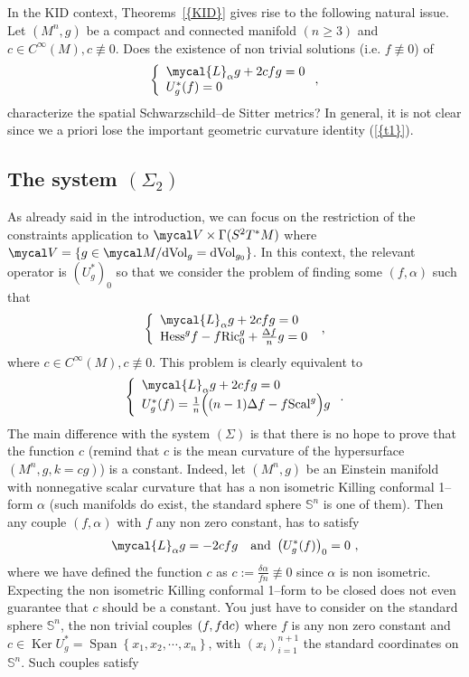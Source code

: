 \documentclass[a4paper,11pt,leqno]{amsart}
\numberwithin{equation}{section}
\theoremstyle{main}
\begin{document}
In the KID context, Theorems~{\ref{{KID}}}  gives rise to the following natural issue.\\
{} Let $(M^n,g)$ be a compact and connected manifold $(n\ge3)$ and ${c\in C^\infty (M), c\not\equiv 0}$. Does the existence of non trivial solutions (i.e. $f\not\equiv0$) of 
$$\left\{
\begin{array}{l}
	 \mycal{L}_\alpha g + 2cfg= 0 \\
	 U_g^* (f)=0
\end{array}\right. ,$$
characterize the spatial Schwarzschild--de Sitter metrics? In general, it is not clear since we a priori lose the important geometric curvature identity ({\ref{{t1}}}).

\subsection{The system $(\Sigma_2)$}
As already said in the introduction, we can focus on the restriction of the constraints application to $\mycal V \times \Gamma(S^2 T^*M)$ where  $\mycal V= \left\{g\in\mycal M/ {\operatorname{dVol}}_g= {\operatorname{dVol}}_{g_0 }\right\} $. In this context, the relevant operator is $\left(U^*_g\right)_0$ so that we consider the problem of finding some $(f,\alpha)$ such that
$$\left\{
\begin{array}{l}
	 \mycal{L}_\alpha g + 2cfg= 0 \\
	 {\operatorname{Hess}}^g f -f {\operatorname{Ric}}^g_0 + \frac{\Delta f}{n} g =0
\end{array}\right. \ ,$$
where $c\in C^{\infty}(M), c\not\equiv0$. This problem is clearly equivalent to 
$$\left\{
\begin{array}{l}
	 \mycal{L}_\alpha g + 2cfg= 0 \\
	 U_g^* (f)=\frac{1}{n}\Big((n-1) \Delta f -f {\operatorname{Scal}}^g\Big) g
\end{array}\right. .$$
The main difference with the system $(\Sigma)$ is that there is no hope to prove that the function $c$ (remind that $c$ is the mean curvature of the hypersurface $(M^n,g,k=cg)$) is a constant. Indeed, let $(M^n,g)$ be an Einstein manifold with nonnegative scalar curvature that has a non isometric Killing conformal 1--form $\alpha$ (such manifolds do exist, the standard sphere $\mathbb S^n$ is one of them). Then any couple $(f,\alpha)$ with $f$ any non zero constant, has to satisfy
$$	\mycal{L}_\alpha g =-2cfg  \quad \textrm{and } \left(U^*_g (f)\right)_0=0  \ ,$$
where we have defined the function $c$ as $c:= \frac{\delta\alpha}{fn}\not\equiv 0$ since $\alpha$ is non isometric. Expecting the non isometric Killing conformal 1--form to be closed does not even guarantee that $c$ should be a constant. You just have to consider on the standard sphere $\mathbb S^n$, the non trivial couples $(f,f{{\rm d}} c)$ where $f$ is any non zero constant and $c\in {\operatorname{Ker}} U^*_g={\operatorname{Span}}\left\{x_1,x_2,\cdots, x_n\right\}$, with $(x_i)^{n+1}_{i=1}$ the standard coordinates on $\mathbb S^n$. Such couples satisfy 
\end{document}

